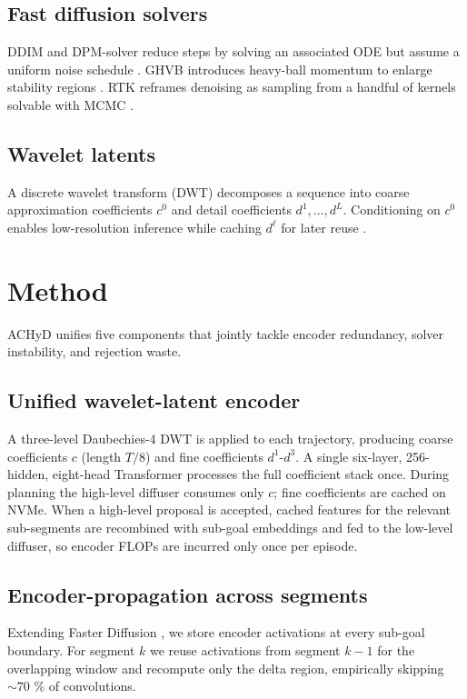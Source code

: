\documentclass{article}
\begin{document}
\subsection{Fast diffusion solvers}
DDIM and DPM-solver reduce steps by solving an associated ODE but assume a uniform noise schedule \cite{li-2023-faster}. GHVB introduces heavy-ball momentum to enlarge stability regions \cite{wizadwongsa-2023-diffusion}. RTK reframes denoising as sampling from a handful of kernels solvable with MCMC \cite{huang-2024-reverse}.

\subsection{Wavelet latents}
A discrete wavelet transform (DWT) decomposes a sequence into coarse approximation coefficients $c^0$ and detail coefficients $d^1, \ldots, d^L$. Conditioning on $c^0$ enables low-resolution inference while caching $d^\ell$ for later reuse \cite{kadkhodaie-2023-learning}.

\section{Method}
ACHyD unifies five components that jointly tackle encoder redundancy, solver instability, and rejection waste.

\subsection{Unified wavelet-latent encoder}
A three-level Daubechies-4 DWT is applied to each trajectory, producing coarse coefficients $c$ (length $T/8$) and fine coefficients $d^1$-$d^3$. A single six-layer, 256-hidden, eight-head Transformer processes the full coefficient stack once. During planning the high-level diffuser consumes only $c$; fine coefficients are cached on NVMe. When a high-level proposal is accepted, cached features for the relevant sub-segments are recombined with sub-goal embeddings and fed to the low-level diffuser, so encoder FLOPs are incurred only once per episode.

\subsection{Encoder-propagation across segments}
Extending Faster Diffusion \cite{li-2023-faster}, we store encoder activations at every sub-goal boundary. For segment $k$ we reuse activations from segment $k-1$ for the overlapping window and recompute only the delta region, empirically skipping $\sim 70$ \% of convolutions.
\end{document}
